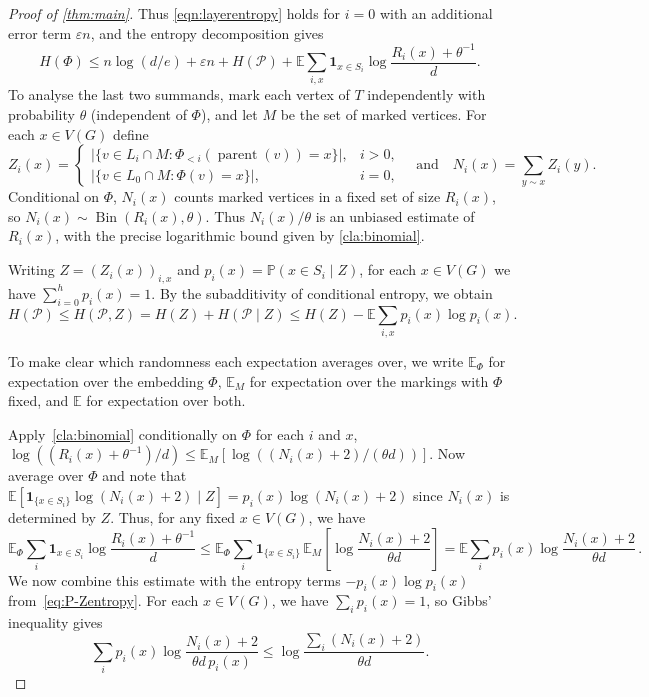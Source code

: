 \documentclass[10pt,a4paper]{amsart}
\numberwithin{equation}{section}
\theoremstyle{definition}
\theoremstyle{remark}
\DeclareMathOperator{\parent}{parent}
\DeclareMathOperator{\Bin}{Bin}
\newcommand{\eps}{\varepsilon}
\begin{document}
\begin{proof}[Proof of \cref{thm:main}]
Thus \eqref{eqn:layerentropy} holds for $i=0$ with an additional error term
$\varepsilon n$, and the entropy decomposition gives
\begin{equation}\label{eq:startingpoint}
    H(\Phi)\leq n\log\left(d/e\right)+\eps n + H(\mathcal{P})+
    \mathbb E\sum_{i,x}\mathbf{1}_{x\in S_i}\log\frac{R_i(x)+\theta^{-1}}{d}.
\end{equation}
To analyse the last two summands, mark each vertex of $T$ independently with probability $\theta$ (independent of $\Phi$), and let $M$ be the set of marked vertices. For each $x\in V(G)$ define
\[
Z_i(x)=
\begin{cases}
\bigl|\{v\in L_i \cap M:\Phi_{<i}(\parent(v))= x\}\bigr|, & i>0,\\
\bigl|\{v\in L_0 \cap M:\Phi(v)=x\}\bigr|, & i=0,
\end{cases}
\quad\text{and}\quad
N_i(x)=\sum_{y\sim x}Z_i(y).
\]
Conditional on $\Phi$, $N_i(x)$ counts marked vertices in a fixed
set of size $R_i(x)$, so $N_i(x)\sim\Bin(R_i(x),\theta)$.
Thus $N_i(x)/\theta$ is an unbiased estimate of $R_i(x)$, with the
precise logarithmic bound given by \cref{cla:binomial}.

Writing $Z=(Z_i(x))_{i,x}$ and $p_i(x)=\mathbb{P}(x\in S_i\mid Z)$, for each $x\in V(G)$ we have $\sum_{i=0}^hp_i(x)=1$. 
By the subadditivity of conditional entropy, we obtain
\begin{equation}\label{eq:P-Zentropy}
    H(\mathcal{P})\leq H(\mathcal{P},Z)=H(Z)+H(\mathcal{P}\mid Z)\leq H(Z)-\mathbb{E}\sum_{i,x}p_i(x)\log p_i(x).
\end{equation} 

To make clear which randomness each expectation averages over,
we write $\mathbb E_\Phi$ for expectation over the embedding $\Phi$,
$\mathbb E_M$ for expectation over the markings with $\Phi$ fixed,
and $\mathbb E$ for expectation over both.

Apply~\cref{cla:binomial} conditionally on $\Phi$  for each $i$ and $x$, 
$ \log((R_i(x)+\theta^{-1})/d) \leq
\mathbb E_M\left[ \log((N_i(x)+2)/(\theta d))\right]$. 
Now average over $\Phi$ and note that 
$\mathbb E \left[ \mathbf{1}_{\{x\in S_i\}} \log (N_i(x)+2) \mid Z \right] = p_i(x) \log (N_i(x)+2)$ since $N_i(x)$ is determined by $Z$. 
Thus, for any fixed $x\in V(G)$, we have
\begin{equation}\label{eq:apply33}
    \mathbb E_\Phi\sum_{i}\mathbf{1}_{x\in S_i}\log\frac{R_i(x)+\theta^{-1}}{d}\leq \mathbb{E}_{\Phi}\sum_i
\mathbf{1}_{\{x\in S_i\}}\,
\mathbb{E}_{M}\!\left[
\log\frac{N_i(x)+2}{\theta d}
\right] = \mathbb E \sum_i p_i(x) \log\frac{N_i(x)+2}{\theta d}\,.
\end{equation}
We now combine this estimate with the entropy terms $-p_i(x)\log p_i(x)$ from~\eqref{eq:P-Zentropy}. For each $x\in V(G)$, we have $\sum_i p_i(x)=1$, so Gibbs' inequality gives
\begin{equation}\label{eq:Gibbs-application}
\sum_i p_i(x)\log\frac{N_i(x)+2}{\theta d\,p_i(x)} \leq \log\frac{\sum_i(N_i(x)+2)}{\theta d}.
\end{equation}


\end{proof}
\end{document}
